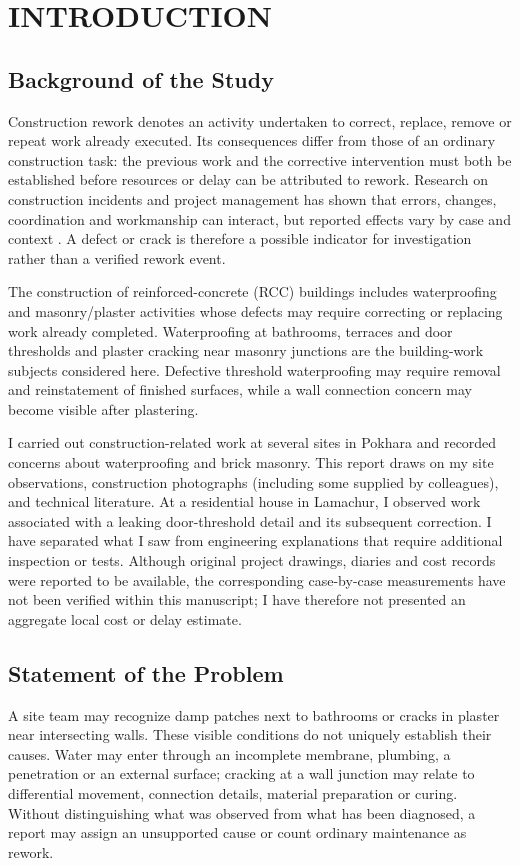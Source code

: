 \chapter{INTRODUCTION}
\section{Background of the Study}
Construction rework denotes an activity undertaken to correct, replace, remove or repeat work already executed. Its consequences differ from those of an ordinary construction task: the previous work and the corrective intervention must both be established before resources or delay can be attributed to rework. Research on construction incidents and project management has shown that errors, changes, coordination and workmanship can interact, but reported effects vary by case and context \parencite{forcada2017,love2022,asadi2023}. A defect or crack is therefore a possible indicator for investigation rather than a verified rework event.

The construction of reinforced-concrete (RCC) buildings includes waterproofing and masonry/plaster activities whose defects may require correcting or replacing work already completed. Waterproofing at bathrooms, terraces and door thresholds and plaster cracking near masonry junctions are the building-work subjects considered here. Defective threshold waterproofing may require removal and reinstatement of finished surfaces, while a wall connection concern may become visible after plastering.

I carried out construction-related work at several sites in Pokhara and recorded concerns about waterproofing and brick masonry. This report draws on my site observations, construction photographs (including some supplied by colleagues), and technical literature. At a residential house in Lamachur, I observed work associated with a leaking door-threshold detail and its subsequent correction. I have separated what I saw from engineering explanations that require additional inspection or tests. Although original project drawings, diaries and cost records were reported to be available, the corresponding case-by-case measurements have not been verified within this manuscript; I have therefore not presented an aggregate local cost or delay estimate.

\section{Statement of the Problem}
A site team may recognize damp patches next to bathrooms or cracks in plaster near intersecting walls. These visible conditions do not uniquely establish their causes. Water may enter through an incomplete membrane, plumbing, a penetration or an external surface; cracking at a wall junction may relate to differential movement, connection details, material preparation or curing. Without distinguishing what was observed from what has been diagnosed, a report may assign an unsupported cause or count ordinary maintenance as rework.

